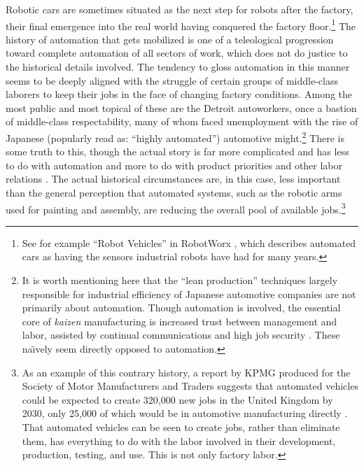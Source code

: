 Robotic cars are sometimes situated as
the next step for robots after the factory, their final emergence into
the real world having conquered the factory floor.\footnote{See for
  example ``Robot Vehicles'' in RobotWorx \cite{robotworx}, which describes automated cars as having the sensors
  industrial robots have had for many years.} The history of
automation that gets mobilized is one of a teleological progression
toward complete automation of all sectors of work, which does not do
justice to the historical details involved. The tendency to gloss
automation in this manner seems
to be deeply aligned with the struggle of certain groups of
middle-class laborers to keep their jobs in the face of changing
factory conditions. Among the most public and most topical of these
are the Detroit autoworkers, once a bastion of middle-class
respectability, many of whom faced unemployment with the rise of
Japanese (popularly read as: ``highly automated'') automotive
might.\footnote{It is worth mentioning here that the ``lean
  production'' techniques largely responsible for industrial
  efficiency of Japanese automotive companies are not primarily about
  automation. Though automation is involved, the essential core of
  \emph{kaizen} manufacturing is increased trust between management
  and labor, assisted by continual communications and high job
  security \cite[p. 198--199]{nyeAmericas}. These na\"{\i}vely seem
  directly opposed to automation.} There is some truth to this, though
the actual story 
is far more complicated and has less to do with automation and more to
do with product priorities and other labor
relations \cite[p. 188--200]{nyeAmericas}. The actual historical
circumstances are, in this case, less important than the general
perception that automated 
systems, such as the robotic arms used for painting and assembly, are
reducing the overall pool of available jobs.\footnote{As an example of
  this contrary history, a report by KPMG produced for the Society of Motor
Manufacturers and Traders suggests that automated vehicles could be
expected to create 320,000 new jobs in the United Kingdom by 2030, only 25,000 of
which would be in automotive manufacturing directly
\cite{toveyCreate}.
That automated vehicles can be seen to create jobs, rather than
eliminate them, has everything to do with the labor involved in their
development, production, testing, and use. This is not only
factory labor.}


